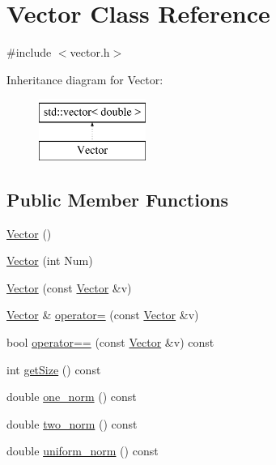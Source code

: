 \hypertarget{classVector}{}\section{Vector Class Reference}
\label{classVector}


{\ttfamily \#include $<$vector.\+h$>$}

Inheritance diagram for Vector\+:\begin{figure}[H]
\begin{center}
\leavevmode
\includegraphics[height=2.000000cm]{classVector}
\end{center}
\end{figure}
\subsection*{Public Member Functions}
\begin{DoxyCompactItemize}
\item 
\mbox{\hyperlink{classVector_a6f80c73b5f18dcf3f8e36065bdc8b9e5}{Vector}} ()
\item 
\mbox{\hyperlink{classVector_acbdf66550f2caa0a64e0b356fb63a277}{Vector}} (int Num)
\item 
\mbox{\hyperlink{classVector_a5f04e343b7306ad11f8a82c89b486764}{Vector}} (const \mbox{\hyperlink{classVector}{Vector}} \&v)
\item 
\mbox{\hyperlink{classVector}{Vector}} \& \mbox{\hyperlink{classVector_ae48c467a9f65d60e2f7455aba4ca1239}{operator=}} (const \mbox{\hyperlink{classVector}{Vector}} \&v)
\item 
bool \mbox{\hyperlink{classVector_ade5fbd0cd01b034d1907e0c93433320c}{operator==}} (const \mbox{\hyperlink{classVector}{Vector}} \&v) const
\item 
int \mbox{\hyperlink{classVector_afbb7966ec4107c43ec15cccc47fcaef7}{get\+Size}} () const
\item 
double \mbox{\hyperlink{classVector_a6752a90058ddef427ca6aed12946a737}{one\+\_\+norm}} () const
\item 
double \mbox{\hyperlink{classVector_a4f501290a50d057bb6c57ea64d7e70a4}{two\+\_\+norm}} () const
\item 
double \mbox{\hyperlink{classVector_a50b72131eaf3698a9876d99ab6912a32}{uniform\+\_\+norm}} () const
\end{DoxyCompactItemize}
